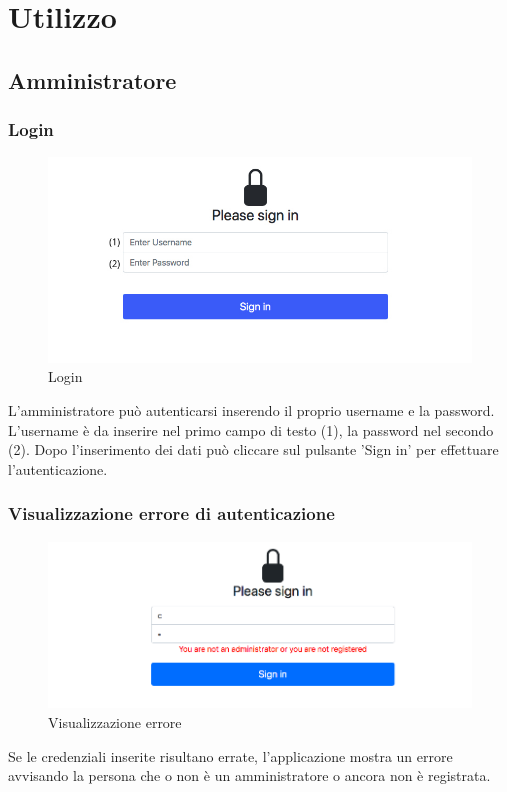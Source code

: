 \section{Utilizzo}

\subsection{Amministratore}
\subsubsection{Login}
\begin{figure}[H]
	\centering
	\includegraphics[width=15cm]{res/images/login.jpg}
	\caption{Login}
\end{figure}
L'amministratore può autenticarsi inserendo il proprio username e la password. L’username è da inserire nel primo campo di testo (1), la password nel secondo (2). Dopo l’inserimento dei dati può cliccare sul pulsante 'Sign in' per effettuare l'autenticazione.

\subsubsection{Visualizzazione errore di autenticazione}
\begin{figure}[H]
	\centering
	\includegraphics[width=15cm]{res/images/error.png}
	\caption{Visualizzazione errore}
\end{figure}
Se le credenziali inserite risultano errate, l’applicazione mostra un errore avvisando la persona che o non è un amministratore o ancora non è registrata.

